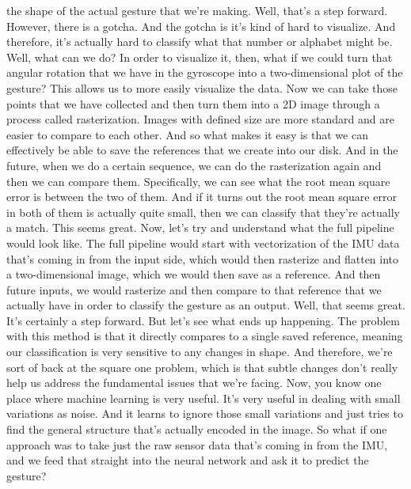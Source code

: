     the shape of the actual gesture that we're making.
    Well, that's a step forward.
    However, there is a gotcha.
    And the gotcha is it's kind of hard to visualize.
    And therefore, it's actually hard to classify
    what that number or alphabet might be.
    Well, what can we do?
    In order to visualize it, then, what if we could turn that angular rotation
    that we have in the gyroscope into a two-dimensional plot of the gesture?
    This allows us to more easily visualize the data.
    Now we can take those points that we have collected
    and then turn them into a 2D image through a process called rasterization.
    Images with defined size are more standard
    and are easier to compare to each other.
    And so what makes it easy is that we can effectively
    be able to save the references that we create into our disk.
    And in the future, when we do a certain sequence,
    we can do the rasterization again and then we can compare them.
    Specifically, we can see what the root mean square error is
    between the two of them.
    And if it turns out the root mean square error in both of them
    is actually quite small, then we can classify that they're actually a match.
    This seems great.
    Now, let's try and understand what the full pipeline would look like.
    The full pipeline would start with vectorization of the IMU data
    that's coming in from the input side, which would then rasterize and flatten
    into a two-dimensional image, which we would then save as a reference.
    And then future inputs, we would rasterize and then
    compare to that reference that we actually have in order
    to classify the gesture as an output.
    Well, that seems great.
    It's certainly a step forward.
    But let's see what ends up happening.
    The problem with this method is that it directly
    compares to a single saved reference, meaning our classification is
    very sensitive to any changes in shape.
    And therefore, we're sort of back at the square one problem,
    which is that subtle changes don't really
    help us address the fundamental issues that we're facing.
    Now, you know one place where machine learning is very useful.
    It's very useful in dealing with small variations as noise.
    And it learns to ignore those small variations
    and just tries to find the general structure that's
    actually encoded in the image.
    So what if one approach was to take just the raw sensor
    data that's coming in from the IMU, and we
    feed that straight into the neural network
    and ask it to predict the gesture?
